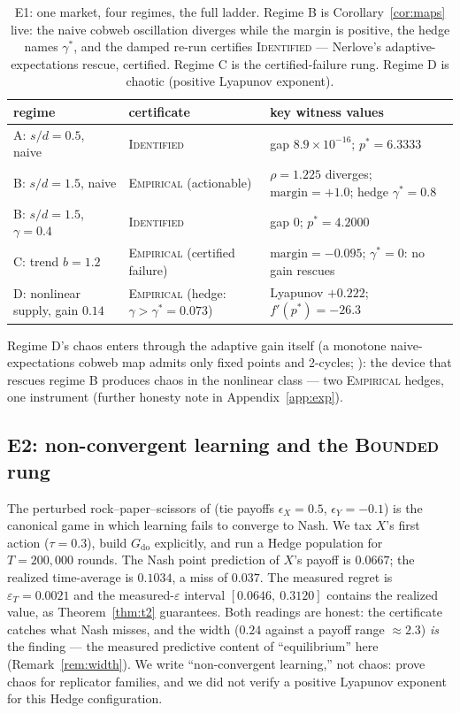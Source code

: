 \documentclass[pmlr]{jmlr}
\newcommand{\doop}{\mathrm{do}}
\newcommand{\margin}{\mathrm{margin}}
\newcommand{\gstar}{\gamma^{*}}
\newcommand{\Cid}{\textsc{Identified}}
\newcommand{\Cbd}{\textsc{Bounded}}
\newcommand{\Cem}{\textsc{Empirical}}
\begin{document}
\begin{table}[t]
\centering
\footnotesize
\begin{tabular}{lll}
\toprule
regime & certificate & key witness values \\
\midrule
A: $s/d = 0.5$, naive & \Cid & gap $8.9 \times 10^{-16}$; $p^* = 6.3333$ \\
B: $s/d = 1.5$, naive & \Cem{} (actionable) & $\rho = 1.225$ diverges; $\margin = +1.0$; hedge $\gstar = 0.8$ \\
B: $s/d = 1.5$, $\gamma = 0.4$ & \Cid & gap $0$; $p^* = 4.2000$ \\
C: trend $b = 1.2$ & \Cem{} (certified failure) & $\margin = -0.095$; $\gstar = 0$: no gain rescues \\
D: nonlinear supply, gain $0.14$ & \Cem{} (hedge: $\gamma > \gstar = 0.073$) & Lyapunov $+0.222$; $f'(p^*) = -26.3$ \\
\bottomrule
\end{tabular}
\caption{E1: one market, four regimes, the full ladder. Regime B is
Corollary~\ref{cor:maps} live: the naive cobweb oscillation diverges while the margin is
positive, the hedge names $\gstar$, and the damped re-run certifies \Cid{} --- Nerlove's
adaptive-expectations rescue, certified. Regime C is the certified-failure rung. Regime D is
chaotic (positive Lyapunov exponent).}
\label{tab:e1}
\end{table}

Regime D's chaos enters through the adaptive gain itself (a monotone naive-expectations cobweb
map admits only fixed points and 2-cycles; \citealp{hommes1994dynamics}): the device that
rescues regime B produces chaos in the nonlinear class --- two \Cem{} hedges, one instrument
(further honesty note in Appendix~\ref{app:exp}).

\subsection{E2: non-convergent learning and the \Cbd{} rung}\label{sec:e2}

The perturbed rock--paper--scissors of \citet{sato2002chaos} (tie payoffs $\epsilon_X = 0.5$,
$\epsilon_Y = -0.1$) is the canonical game in which learning fails to converge to Nash. We tax
$X$'s first action ($\tau = 0.3$), build $G_{\doop}$ explicitly, and run a Hedge population for
$T = 200{,}000$ rounds. The Nash point prediction of $X$'s payoff is $0.0667$; the realized
time-average is $0.1034$, a miss of $0.037$. The measured regret is $\varepsilon_T = 0.0021$ and
the measured-$\varepsilon$ interval $[0.0646,\ 0.3120]$ contains the realized value, as
Theorem~\ref{thm:t2} guarantees. Both readings are honest: the certificate catches what Nash
misses, and the width ($0.24$ against a payoff range $\approx 2.3$) \emph{is} the finding ---
the measured predictive content of ``equilibrium'' here (Remark~\ref{rem:width}). We write
``non-convergent learning,'' not chaos: \citet{sato2002chaos} prove chaos for replicator
families, and we did not verify a positive Lyapunov exponent for this Hedge configuration.
\end{document}
